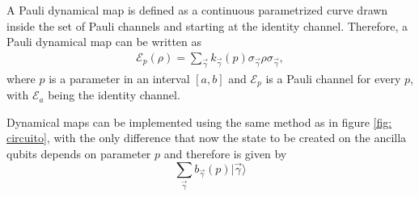 A Pauli dynamical map is defined as a continuous parametrized 
curve drawn inside the set of Pauli channels and starting at the identity channel. 
Therefore, a Pauli dynamical map can be written as
\begin{eqnarray}
\mathcal{E}_p(\rho) = \sum_{\vec{\gamma}} k_{\vec{\gamma}}(p) \sigma_{\vec{\gamma}} \rho \sigma_{\vec{\gamma}},
\end{eqnarray}
where $p$ is a parameter in an interval $[a,b]$ 
and $\mathcal{E}_p$ is a Pauli channel for every $p$, 
with $\mathcal{E}_a$ being the identity channel.

Dynamical maps can be implemented using the same method as 
in figure \ref{fig: circuito}, with the only difference that now the state 
to be created on the ancilla qubits depends on parameter $p$ 
and therefore is given by 
\begin{equation}
\label{ec: parametrized state}
\sum_{\vec{\gamma}} b_{\vec{\gamma}}(p) |\vec{\gamma}\rangle
\end{equation}

\newpage